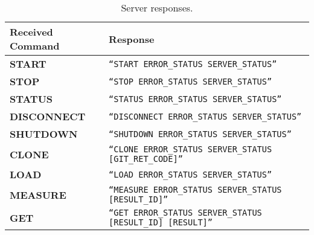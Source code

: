 
\begin{table}[htpb]
    \centering
    \tiny
    \begin{tabular}{@{}TK@{}}
        \toprule
        {\bf Received Command} & {\bf Response} \\ \midrule
        {\tiny \bf START} &
        {\tiny \tt ``START ERROR\_STATUS SERVER\_STATUS''} \\ \midrule
        {\tiny \bf STOP} &
        {\tiny \tt ``STOP ERROR\_STATUS SERVER\_STATUS''} \\ \midrule
        {\tiny \bf STATUS} &
        {\tiny \tt ``STATUS ERROR\_STATUS SERVER\_STATUS''} \\ \midrule
        {\tiny \bf DISCONNECT} &
        {\tiny \tt ``DISCONNECT ERROR\_STATUS SERVER\_STATUS''} \\ \midrule
        {\tiny \bf SHUTDOWN} &
        {\tiny \tt ``SHUTDOWN ERROR\_STATUS SERVER\_STATUS''} \\ \midrule
        {\tiny \bf CLONE} &
        {\tiny \tt ``CLONE ERROR\_STATUS SERVER\_STATUS [GIT\_RET\_CODE]''} \\ \midrule
        {\tiny \bf LOAD} &
        {\tiny \tt ``LOAD ERROR\_STATUS SERVER\_STATUS''} \\ \midrule
        {\tiny \bf MEASURE} &
        {\tiny \tt ``MEASURE ERROR\_STATUS SERVER\_STATUS [RESULT\_ID]''} \\ \midrule
        {\tiny \bf GET} &
        {\tiny \tt ``GET ERROR\_STATUS SERVER\_STATUS [RESULT\_ID] [RESULT]''} \\ \bottomrule
    \end{tabular}
    \caption{Server responses.}
    \label{tab:protocol-responses}
\end{table}
